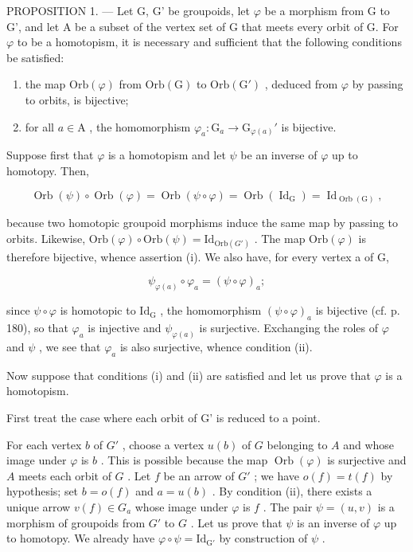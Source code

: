 PROPOSITION 1. --- Let G, G' be groupoids, let \(\varphi\) be a morphism from G to G', and let A be a subset of the vertex set of G that meets every orbit of G. For \(\varphi\) to be a homotopism, it is necessary and sufficient that the following conditions be satisfied:

\begin{enumerate}
\def\labelenumi{(\roman{enumi})}
\item
  the map \(\mathrm{Orb}(\varphi)\) from \(\mathrm{Orb}(\mathrm{G})\) to \(\mathrm{Orb}(\mathrm{G}')\) , deduced from \(\varphi\) by passing to orbits, is bijective;
\item
  for all \(a \in \mathrm{A}\) , the homomorphism \(\varphi_a \colon \mathrm{G}_a \to \mathrm{G}_{\varphi(a)}'\) is bijective.
\end{enumerate}

Suppose first that \(\varphi\) is a homotopism and let \(\psi\) be an inverse of \(\varphi\) up to homotopy. Then,

\[
\operatorname{Orb} (\psi) \circ \operatorname{Orb} (\varphi) = \operatorname{Orb} (\psi \circ \varphi) = \operatorname{Orb} (\operatorname{Id} _ {\mathrm{G}}) = \operatorname{Id} _ {\operatorname{Orb} (\mathrm{G})},
\]

because two homotopic groupoid morphisms induce the same map by passing to orbits. Likewise, \(\mathrm{Orb}(\varphi) \circ \mathrm{Orb}(\psi) = \mathrm{Id}_{\mathrm{Orb}(G')}\) . The map \(\mathrm{Orb}(\varphi)\) is therefore bijective, whence assertion (i). We also have, for every vertex a of G,

\[
\psi_ {\varphi (a)} \circ \varphi_ {a} = (\psi \circ \varphi) _ {a};
\]

since \(\psi \circ \varphi\) is homotopic to \(\mathrm{Id}_{\mathrm{G}}\) , the homomorphism \((\psi \circ \varphi)_a\) is bijective (cf. p. 180), so that \(\varphi_a\) is injective and \(\psi_{\varphi(a)}\) is surjective. Exchanging the roles of \(\varphi\) and \(\psi\) , we see that \(\varphi_a\) is also surjective, whence condition (ii).

Now suppose that conditions (i) and (ii) are satisfied and let us prove that \(\varphi\) is a homotopism.

First treat the case where each orbit of G' is reduced to a point.

For each vertex \(b\) of \(G'\) , choose a vertex \(u(b)\) of \(G\) belonging to \(A\) and whose image under \(\varphi\) is \(b\) . This is possible because the map \(\operatorname{Orb}(\varphi)\) is surjective and \(A\) meets each orbit of \(G\) . Let \(f\) be an arrow of \(G'\) ; we have \(o(f) = t(f)\) by hypothesis; set \(b = o(f)\) and \(a = u(b)\) . By condition (ii), there exists a unique arrow \(v(f) \in G_a\) whose image under \(\varphi\) is \(f\) . The pair \(\psi = (u, v)\) is a morphism of groupoids from \(G'\) to \(G\) . Let us prove that \(\psi\) is an inverse of \(\varphi\) up to homotopy. We already have \(\varphi \circ \psi = \mathrm{Id}_{\mathrm{G}'}\) by construction of \(\psi\) .


